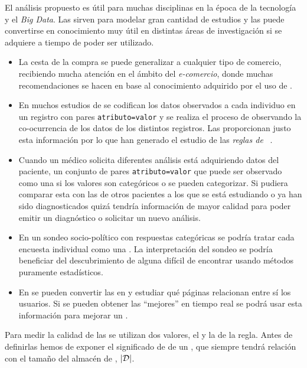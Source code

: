 El análisis propuesto es útil para muchas disciplinas en la época de la tecnología y el \emph{Big Data}. Las \transacciones sirven para modelar gran cantidad de estudios y las \ars puede convertirse en conocimiento muy útil en distintas áreas de investigación si se adquiere a tiempo de poder ser utilizado.

\begin{itemize}
  \item La cesta de la compra se puede generalizar a cualquier tipo de comercio, recibiendo mucha atención en el ámbito del \emph{e-comercio}, donde muchas recomendaciones se hacen en base al conocimiento adquirido por el uso de \ars.
  \item En muchos estudios de \clasificacion se codifican los datos observados a cada individuo en un registro con pares \texttt{atributo=valor} y se realiza el proceso de \clasificacion observando la co-ocurrencia de los datos de los distintos registros. Las \ars proporcionan justo esta información por lo que han generado el estudio de las \emph{reglas de \clasificacion}~\citep{LiuHsuMa-IntegratingClassificationAndARM-1998,ThabtahCowlingHammoud-ImprovingRuleSorting-2006,KahramanliAllahverdi-NewMethodForComposingClassificationRulesARplusOPTBP-2009}.
  \item Cuando un médico solicita diferentes análisis está adquiriendo datos del paciente, un conjunto de pares \texttt{atributo=valor} que puede ser observado como una \transaccion si los valores son categóricos o se pueden categorizar. Si pudiera comparar esta \transaccion con las \transacciones de otros pacientes a los que se está estudiando o ya han sido diagnosticados quizá tendría información de mayor calidad para poder emitir un diagnóstico o solicitar un nuevo análisis.
  \item En un sondeo socio-político con respuestas categóricas se podría tratar cada encuesta individual como una \transaccion. La interpretación del sondeo se podría beneficiar del descubrimiento de alguna \ar difícil de encontrar usando métodos puramente estadísticos.
  \item En \wum se pueden convertir las \sns en \transacciones y estudiar qué páginas relacionan entre sí los usuarios. Si se pueden obtener las "`mejores"' \ars en tiempo real se podrá usar esta información para mejorar un \srw.
\end{itemize}






Para medir la calidad de las \ARs se utilizan dos valores, el \soporte y la \confianza de la regla. Antes de definirlas hemos de exponer el significado de \soporte de un \itemset, que siempre tendrá relación con el tamaño del almacén de \transacciones, $|\D|$.


